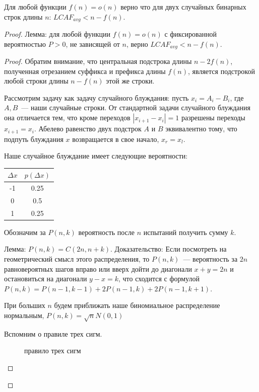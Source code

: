 \begin{theorem} %
Для любой функции $f(n)=o(n)$ верно что для двух случайных бинарных строк длины $n$: $LCAF_{avg} < n - f(n)$.
\end{theorem}
\begin{proof}

Лемма: для любой функции $f(n)=o(n)$ с фиксированной вероятностью $P>0$, не зависящей от $n$, верно $LCAF_{avg} < n - f(n)$.

\begin{proof}
Обратим внимание, что центральная подстрока длины $n-2f(n)$, полученная отрезанием суффикса и префикса длины $f(n)$, является подстрокой любой строки длины $n-f(n)$ этой же строки.

Рассмотрим задачу как задачу случайного блуждания: пусть $x_i = A_i - B_i$, где $A, B$~--- наши случайные строки. От стандартной задачи случайного блуждания она отличается тем, что кроме переходов $|x_{i+1}-x_i|=1$ разрешены переходы $x_{i+1}=x_i$. Абелево равенство двух подстрок $A$ и $B$ эквивалентно тому, что подпуть блуждания $x$ возвращается в свое начало, $x_r=x_l$.

Наше случайное блуждание имеет следующие вероятности:

\begin{tabular}{|c|c|}
\hline
$\Delta x$ & $p(\Delta x)$ \\
\hline
-1 & 0.25 \\
\hline
0 & 0.5 \\
\hline
1 & 0.25 \\
\hline
\end{tabular}

Обозначим за $P(n, k)$ вероятность после $n$ испытаний получить сумму $k$. 

Лемма: $P(n, k)=C(2n, n+k)$.
Доказательство:
Если посмотреть на геометрический смысл этого распределения, то $P(n,k)$~--- вероятность за $2n$ равновероятных шагов вправо или вверх дойти до диагонали $x+y=2n$ и остановиться на диагонали $y-x=k$, что сходится с формулой $P(n,k)=P(n-1,k-1)+2P(n-1,k)+2P(n-1,k+1)$.

При больших $n$ будем приближать наше биномиальное распределение нормальным, $P(n, k)=\sqrt {n} N(0,1)$

Вспомним о правиле трех сигм.

\begin{figure}[h]
\caption{правило трех сигм \cite{3}}
\end{figure}


\end{proof}
\end{proof}

